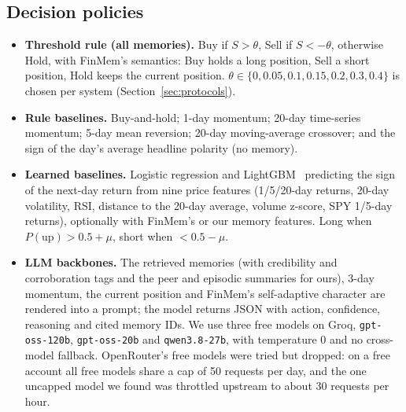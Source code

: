 \subsection{Decision policies}
\begin{itemize}
  \item \textbf{Threshold rule (all memories).} Buy if $S>\theta$, Sell if $S<-\theta$, otherwise Hold, with FinMem's semantics: Buy holds a long position, Sell a short position, Hold keeps the current position. $\theta\in\{0,0.05,0.1,0.15,0.2,0.3,0.4\}$ is chosen per system (Section~\ref{sec:protocols}).
  \item \textbf{Rule baselines.} Buy-and-hold; 1-day momentum; 20-day time-series momentum; 5-day mean reversion; 20-day moving-average crossover; and the sign of the day's average headline polarity (no memory).
  \item \textbf{Learned baselines.} Logistic regression and LightGBM~\cite{ke2017lightgbm} predicting the sign of the next-day return from nine price features (1/5/20-day returns, 20-day volatility, RSI, distance to the 20-day average, volume z-score, SPY 1/5-day returns), optionally with FinMem's or our memory features. Long when $P(\text{up})>0.5+\mu$, short when $<0.5-\mu$.
  \item \textbf{LLM backbones.} The retrieved memories (with credibility and corroboration tags and the peer and episodic summaries for ours), 3-day momentum, the current position and FinMem's self-adaptive character are rendered into a prompt; the model returns JSON with action, confidence, reasoning and cited memory IDs. We use three free models on Groq, \texttt{gpt-oss-120b}, \texttt{gpt-oss-20b} and \texttt{qwen3.8-27b}, with temperature 0 and no cross-model fallback. OpenRouter's free models were tried but dropped: on a free account all free models share a cap of 50 requests per day, and the one uncapped model we found was throttled upstream to about 30 requests per hour.
\end{itemize}

